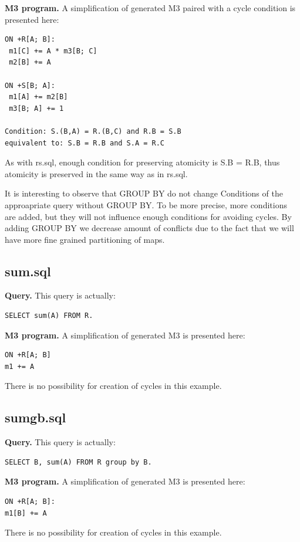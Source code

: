 \documentclass{sig-semester}
\begin{document}
\newpage
\textbf{M3 program.} A simplification of generated M3 paired with a cycle condition is presented here:
\begin{verbatim}
ON +R[A; B]:
 m1[C] += A * m3[B; C]
 m2[B] += A

ON +S[B; A]: 
 m1[A] += m2[B]
 m3[B; A] += 1

Condition: S.(B,A) = R.(B,C) and R.B = S.B
equivalent to: S.B = R.B and S.A = R.C
\end{verbatim}

As with rs.sql, enough condition for preserving atomicity is S.B = R.B, thus atomicity is preserved in the same way as in rs.sql.

It is interesting to observe that GROUP BY do not change Conditions of the approapriate query without GROUP BY. To be more precise, more conditions are added, but they will not influence enough conditions for avoiding cycles. By adding GROUP BY we decrease amount of conflicts due to the fact that we will have more fine grained partitioning of maps.

\subsection{sum.sql}
\textbf{Query.} This query is actually:
\begin{verbatim}
SELECT sum(A) FROM R.
\end{verbatim}

\textbf{M3 program.} A simplification of generated M3 is presented here:
\begin{verbatim}
ON +R[A; B]
m1 += A
\end{verbatim}

There is no possibility for creation of cycles in this example.

\subsection{sumgb.sql}
\textbf{Query.} This query is actually:
\begin{verbatim}
SELECT B, sum(A) FROM R group by B.
\end{verbatim}

\textbf{M3 program.} A simplification of generated M3 is presented here:
\begin{verbatim}
ON +R[A; B]:
m1[B] += A
\end{verbatim}

There is no possibility for creation of cycles in this example.
\end{document}
